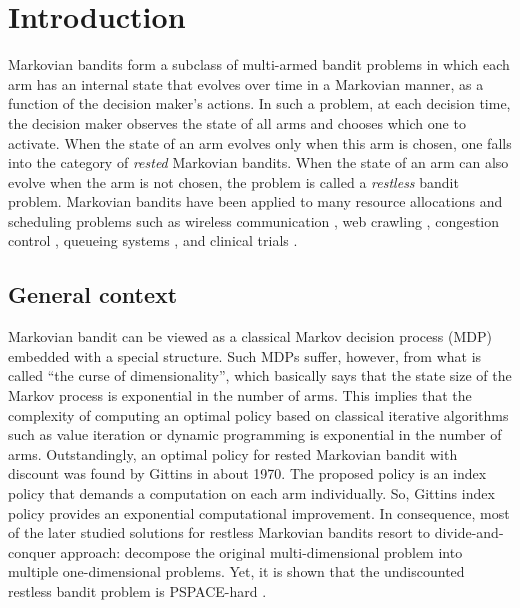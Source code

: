 \begingroup
\let\clearpage\relax

\chapter{Introduction}
\label{chapter:introduction}

Markovian bandits form a subclass of multi-armed bandit problems in which each arm has an internal state that evolves over time in a Markovian manner, as a function of the decision maker’s actions.
In such a problem, at each decision time, the decision maker observes the state of all arms and chooses which one to activate.
When the state of an arm evolves only when this arm is chosen, one falls into the category of \emph{rested} Markovian bandits.
When the state of an arm can also evolve when the arm is not chosen, the problem is called a \emph{restless} bandit problem.
Markovian bandits have been applied to many resource allocations and scheduling problems such as wireless communication \cite{raghunathan2008index, liu2010indexability, aalto2019whittle}, web crawling \cite{nino2014dynamic, avrachenkov2022whittle}, congestion control \cite{avrachenkov2013congestion, avrachenkov2018impulsive}, queueing systems \cite{glazebrook2009index, aalto2009gittins, archibald2009indexability, aalto2011properties, larranaga2015asymptotically, borkar2017whittle, scully2018soap}, and clinical trials \cite{villar2015multi}.

\section{General context}

Markovian bandit can be viewed as a classical Markov decision process (MDP) embedded with a special structure.
Such MDPs suffer, however, from what is called ``the curse of dimensionality'', which basically says that the state size of the Markov process is exponential in the number of arms.
This implies that the complexity of computing an optimal policy based on classical iterative algorithms such as value iteration or dynamic programming is exponential in the number of arms.
Outstandingly, an optimal policy for rested Markovian bandit with discount was found by Gittins \cite{gittins1979bandit} in about 1970.
The proposed policy is an index policy that demands a computation on each arm individually.
So, Gittins index policy provides an exponential computational improvement.
In consequence, most of the later studied solutions for restless Markovian bandits resort to divide-and-conquer approach: decompose the original multi-dimensional problem into multiple one-dimensional problems.
Yet, it is shown that the undiscounted restless bandit problem is PSPACE-hard \cite[Theorem~4]{papadimitriou1994complexity}.

